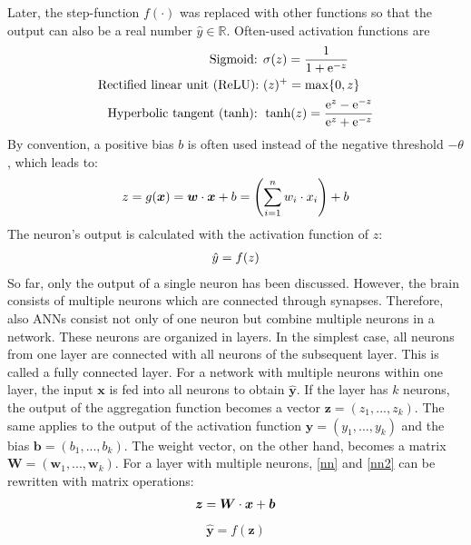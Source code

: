 %
Later, the step-function \(f(\cdot)\) was replaced with other functions so that the output can also be a real number \(\hat{y} \in \mathbb{R}\). Often-used activation functions are
%
\begin{align}\eqlbl{act_functions}%
	\begin{aligned}
		\text{Sigmoid: } & \sigma(z) = \frac{1}{1+\mathrm{e}^{-z}}\\
		\text{Rectified linear unit (ReLU): } & (z)^{+} = \max\{0, z\}\\
		\text{Hyperbolic tangent (tanh): }  & \tanh(z) = \frac{\mathrm{e}^{z}-\mathrm{e}^{-z}}{\mathrm{e}^{z}+\mathrm{e}^{-z}}
	\end{aligned}
\end{align}
%
By convention, a positive bias $b$ is often used instead of the negative threshold $- \theta$, which leads to:
%
\begin{align}\eqlbl{nn}%
	z = g(\boldsymbol{x}) = \boldsymbol{w} \cdot \boldsymbol{x} + b = \left( \sum_{i=1}^{n}w_i \cdot x_i \right) + b
\end{align}
%
The neuron's output is calculated with the activation function of $z$:
%
\begin{align}\eqlbl{nn2}%
	\hat{y} = f(z)
\end{align}
%
So far, only the output of a single neuron has been discussed.
However, the brain consists of multiple neurons which are connected through synapses.
Therefore, also ANNs consist not only of one neuron but combine multiple neurons in a network. 
These neurons are organized in layers.
In the simplest case, all neurons from one layer are connected with all neurons of the subsequent layer. This is called a fully connected layer.
For a network with multiple neurons within one layer, the input $\boldsymbol{x}$ is fed into all neurons to obtain $\boldsymbol{\hat{y}}$.
If the layer has $k$ neurons, the output of the aggregation function becomes a vector $\boldsymbol{z} = (z_1, ..., z_k)$. The same applies to the output of the activation function $\boldsymbol{y} = (y_1, ..., y_k)$ and the bias $\boldsymbol{b} = (b_1, ..., b_k)$. The weight vector, on the other hand, becomes a matrix $\boldsymbol{W} = (\boldsymbol{w}_1, ..., \boldsymbol{w}_k)$. For a layer with multiple neurons, \eqref{nn} and \eqref{nn2} can be rewritten with matrix operations:
%
\begin{align}\eqlbl{nn3}%
	\boldsymbol{z} = \boldsymbol{W} \cdot \boldsymbol{x} + \boldsymbol{b}
\end{align}
\begin{align}
	\hat{\boldsymbol{y}} = f(\boldsymbol{z})
\end{align}
